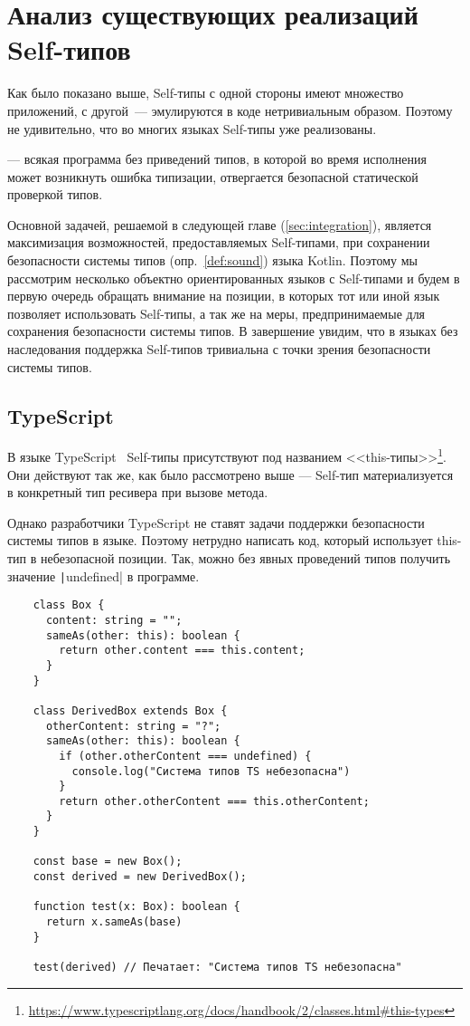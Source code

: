 \section{Анализ существующих реализаций Self-типов}

Как было показано выше, Self-типы с одной стороны имеют множество приложений, с другой~--- эмулируются в коде нетривиальным образом.
Поэтому не удивительно, что во многих языках Self-типы уже реализованы.

\begin{definition}
    \label{def:sound}
     --- всякая программа без приведений типов, в которой во время исполнения может возникнуть ошибка типизации, отвергается безопасной статической проверкой типов.
\end{definition}

Основной задачей, решаемой в следующей главе (\ref{sec:integration}), является максимизация возможностей, предоставляемых Self-типами, при сохранении безопасности системы типов (опр.~\ref{def:sound}) языка Kotlin.
Поэтому мы рассмотрим несколько объектно ориентированных языков с Self-типами и будем в первую очередь обращать внимание на позиции, в которых тот или иной язык позволяет использовать Self-типы, а так же на меры, предпринимаемые для сохранения безопасности системы типов.
В завершение увидим, что в языках без наследования поддержка Self-типов тривиальна с точки зрения безопасности системы типов.

\subsection{TypeScript}

В языке TypeScript~\cite{bierman2014understanding} Self-типы присутствуют под названием <<this-типы>>\footnote{\url{https://www.typescriptlang.org/docs/handbook/2/classes.html\#this-types}}.
Они действуют так же, как было рассмотрено выше --- Self-тип материализуется в конкретный тип ресивера при вызове метода.

Однако разработчики TypeScript не ставят задачи поддержки безопасности системы типов в языке.
Поэтому нетрудно написать код, который использует this-тип в небезопасной позиции.
Так, можно без явных проведений типов получить значение \texttt|undefined| в программе.

\begin{verbatim}
    class Box {
      content: string = "";
      sameAs(other: this): boolean {
        return other.content === this.content;
      }
    }

    class DerivedBox extends Box {
      otherContent: string = "?";
      sameAs(other: this): boolean {
        if (other.otherContent === undefined) {
          console.log("Система типов TS небезопасна")
        }
        return other.otherContent === this.otherContent;
      }
    }

    const base = new Box();
    const derived = new DerivedBox();

    function test(x: Box): boolean {
      return x.sameAs(base)
    }

    test(derived) // Печатает: "Система типов TS небезопасна"
\end{verbatim}


